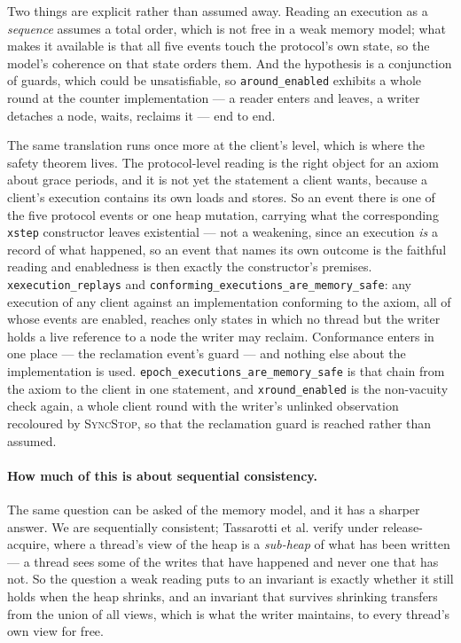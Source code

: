 Two things are explicit rather than assumed away.  Reading an execution as a
\emph{sequence} assumes a total order, which is not free in a weak memory
model; what makes it available is that all five events touch the protocol's own
state, so the model's coherence on that state orders them.  And the hypothesis
is a conjunction of guards, which could be unsatisfiable, so
\texttt{around\_enabled} exhibits a whole round at the counter implementation
--- a reader enters and leaves, a writer detaches a node, waits, reclaims it ---
end to end.

The same translation runs once more at the client's level, which is where the
safety theorem lives.  The protocol-level reading is the right object for an
axiom about grace periods, and it is not yet the statement a client wants,
because a client's execution contains its own loads and stores.  So an event
there is one of the five protocol events or one heap mutation, carrying what the
corresponding \texttt{xstep} constructor leaves existential --- not a
weakening, since an execution \emph{is} a record of what happened, so an event
that names its own outcome is the faithful reading and enabledness is then
exactly the constructor's premises.  \texttt{xexecution\_replays} and
\texttt{conforming\_executions\_are\_memory\_safe}: any execution of any
client against an implementation conforming to the axiom, all of whose events
are enabled, reaches only states in which no thread but the writer holds a live
reference to a node the writer may reclaim.  Conformance enters in one place ---
the reclamation event's guard --- and nothing else about the implementation is
used.  \texttt{epoch\_executions\_are\_memory\_safe} is that chain from the
axiom to the client in one statement, and \texttt{xround\_enabled} is the
non-vacuity check again, a whole client round with the writer's unlinked
observation recoloured by \textsc{SyncStop}, so that the reclamation guard is
reached rather than assumed.

\paragraph{How much of this is about sequential consistency.}
The same question can be asked of the memory model, and it has a sharper
answer.  We are sequentially consistent; Tassarotti et al. verify under
release-acquire, where a thread's view of the heap is a \emph{sub-heap} of what
has been written --- a thread sees some of the writes that have happened and
never one that has not.  So the question a weak reading puts to an invariant is
exactly whether it still holds when the heap shrinks, and an invariant that
survives shrinking transfers from the union of all views, which is what the
writer maintains, to every thread's own view for free.

